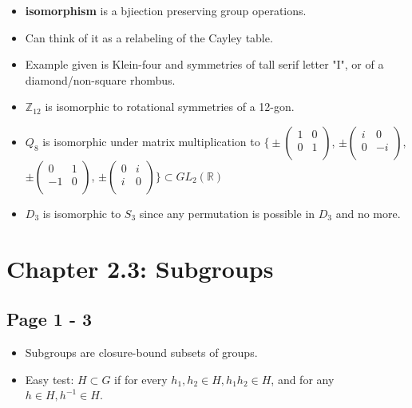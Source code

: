 \documentclass[11pt, oneside]{article}   	%
\begin{document}
\begin{itemize}
\item \textbf{isomorphism} is a bjiection preserving group operations.
\item Can think of it as a relabeling of the Cayley table.
\item Example given is Klein-four and symmetries of tall serif letter "I", or of a diamond/non-square rhombus.
\item $\mathbb{Z}_{12}$ is isomorphic to rotational symmetries of a 12-gon.
\item $Q_8$ is isomorphic under matrix multiplication to 
$\Bigg\{\pm \begin{pmatrix}
    1      & 0 \\
    0       & 1 \\

\end{pmatrix}
$, 
$\pm \begin{pmatrix}
    i      & 0 \\
    0       & -i \\

\end{pmatrix}
$, 
$\pm \begin{pmatrix}
    0      & 1 \\
    -1       & 0 \\

\end{pmatrix}
$, 
$\pm \begin{pmatrix}
    0      & i \\
    i       & 0 \\

\end{pmatrix}
\Bigg\} \subset GL_2(\mathbb{R})$ 
\item $D_3$ is isomorphic to $S_3$ since any permutation is possible in $D_3$ and no more.
\end{itemize}


\section {Chapter 2.3: Subgroups}

\subsection {Page 1 - 3}

\begin{itemize}
\item Subgroups are closure-bound subsets of groups.  
\item Easy test: $H \subset G$ if for every $h_1, h_2 \in H, h_1h_2 \in H$, and for any $h \in H, h^{-1} \in H$.
\end{itemize}
\end{document}

